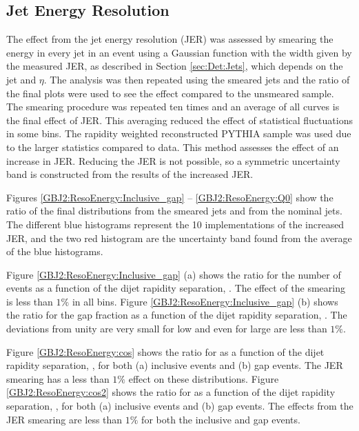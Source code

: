 \subsection{Jet Energy Resolution}
\label{GBJ2:JER}

The effect from the jet energy resolution (JER) was assessed by smearing the energy in every jet in an event using a Gaussian function with the width given by the measured JER, as described in Section \ref{sec:Det:Jets}, which depends on the jet \pt{} and $\eta$. 
The analysis was then repeated using the smeared jets and the ratio of the final plots were used to see the effect compared to the unsmeared sample.
The smearing procedure was repeated ten times and an average of all curves is the final effect of JER.
This averaging reduced the effect of statistical fluctuations in some bins.
The rapidity weighted reconstructed PYTHIA sample was used due to the larger statistics compared to data.
This method assesses the effect of an increase in JER. 
Reducing the JER is not possible, so a symmetric uncertainty band is constructed from the results of the increased JER.

Figures \ref{GBJ2:ResoEnergy:Inclusive_gap} -- \ref{GBJ2:ResoEnergy:Q0} show the ratio of the final distributions from the smeared jets and from the nominal jets.
The different blue histograms represent the 10 implementations of the increased JER, and the two red histogram are the uncertainty band found from the average of the blue histograms.  

Figure \ref{GBJ2:ResoEnergy:Inclusive_gap} (a) shows the ratio for the number of events as a function of the dijet rapidity separation, \dy{}.
The effect of the smearing is less than  $1\%$ in all bins.
Figure \ref{GBJ2:ResoEnergy:Inclusive_gap} (b) shows the ratio for the gap fraction as a function of the dijet rapidity separation, \dy{}.
The deviations from unity are very small for low \dy{} and even for large \dy{} are less than  $1\%$.


Figure \ref{GBJ2:ResoEnergy:cos} shows the ratio for \mean{\cosdphi{}} as a function of the dijet rapidity separation, \dy{}, for both (a) inclusive events and (b) gap events.
The JER smearing has a less than  $1\%$ effect on these distributions.
Figure \ref{GBJ2:ResoEnergy:cos2} shows the ratio for \mean{\costwodphi{}} as a function of the dijet rapidity separation, \dy{}, for both (a) inclusive events and (b) gap events.
The effects from the JER smearing are less than  $1\%$ for both the inclusive and gap events.

